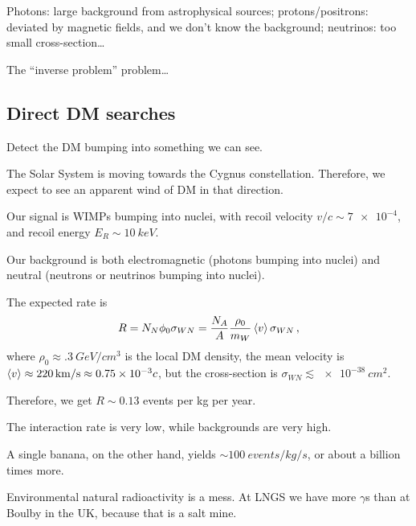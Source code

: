 \documentclass[main.tex]{subfiles}
\begin{document}
Photons: large background from astrophysical sources; protons/positrons: deviated by magnetic fields, and we don't know the background; neutrinos: too small cross-section\dots

The ``inverse problem'' problem\dots


\subsection{Direct DM searches}

Detect the DM bumping into something we can see. 

The Solar System is moving towards the Cygnus constellation. 
Therefore, we expect to see an apparent wind of DM in that direction.



Our signal is WIMPs bumping into nuclei, with recoil velocity \(v/c \sim \num{7e-4}\), and recoil energy \(E_R \sim \SI{10}{keV}\).

Our background is both electromagnetic (photons bumping into nuclei) and neutral (neutrons or neutrinos bumping into nuclei). 

The expected rate is 
%
\begin{align}
R = N_N \phi_0 \sigma_{WN} = \frac{N_A}{A} \frac{\rho_0 }{m_W} \expval{v} \sigma_{WN}
\,,
\end{align}
%
where \(\rho_0 \approx \SI{.3}{GeV / cm^3}\) is the local DM density, the mean velocity is \(\expval{v} \approx \SI{220}{km/s} \approx \num{.75e-3} c\), but the cross-section is \(\sigma_{WN} \lesssim \SI{e-38}{cm^2}\).

Therefore, we get \(R \sim \num{0.13}\) events per kg per year. 

The interaction rate is very low, while backgrounds are very high.

A single banana, on the other hand, yields \(\sim \SI{100}{events/kg/s}\), or about a billion times more.


Environmental natural radioactivity is a mess. 
At LNGS we have more \(\gamma \)s than at Boulby in the UK, because that is a salt mine. 

\end{document}
